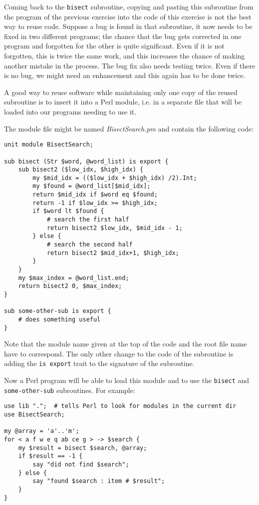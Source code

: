 \label{bisect_module}
Coming back to the {\tt bisect} subroutine, copying 
and pasting this subroutine from the program of the 
previous exercise into the code of this exercise is 
not the best way to reuse code. Suppose a bug is 
found in that subroutine, it now needs to be fixed 
in two different programs; the chance that the bug gets 
corrected in one program and forgotten for the other 
is quite significant. Even if it is not forgotten, this 
is twice the same work, and this increases the chance 
of making another mistake in the process. The bug fix 
also needs testing twice. Even if there is no bug, we 
might need an enhancement and this again has to be done 
twice. 

A good way to reuse software while maintaining only 
one copy of the reused subroutine is to insert it into 
a Perl module, i.e. in a separate file that will be 
loaded into our programs needing to use it.

The module file might be named \emph{BisectSearch.pm} 
and contain the following code:

\begin{verbatim}
unit module BisectSearch;

sub bisect (Str $word, @word_list) is export {
    sub bisect2 ($low_idx, $high_idx) {
        my $mid_idx = (($low_idx + $high_idx) /2).Int;
        my $found = @word_list[$mid_idx];
        return $mid_idx if $word eq $found;
        return -1 if $low_idx >= $high_idx;
        if $word lt $found {
            # search the first half
            return bisect2 $low_idx, $mid_idx - 1;
        } else {
            # search the second half
            return bisect2 $mid_idx+1, $high_idx;
        }
    }
    my $max_index = @word_list.end;
    return bisect2 0, $max_index;
}

sub some-other-sub is export {
    # does something useful
}
\end{verbatim}

Note that the module name given at the top of the code 
and the root file name have to correspond. The only other 
change to the code of the subroutine is adding the 
{\tt is export} trait to the signature of the subroutine.

Now a Perl program will be able to load this module 
and to use the {\tt bisect} and {\tt some-other-sub} 
subroutines. For example:
\begin{verbatim}
use lib ".";  # tells Perl to look for modules in the current dir
use BisectSearch;

my @array = 'a'..'m';
for < a f w e q ab ce g > -> $search { 
    my $result = bisect $search, @array;
    if $result == -1 {
        say "did not find $search";
    } else {
        say "found $search : item # $result";
    }
}
\end{verbatim}
%

